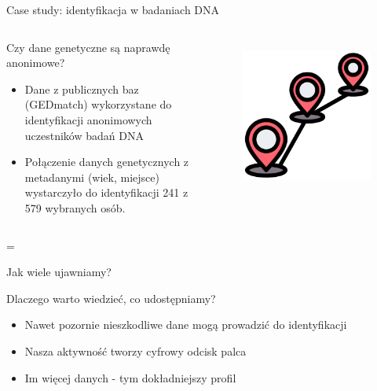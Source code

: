   \begin{frame}{Case study: identyfikacja w badaniach DNA}
  \begin{columns}[c]
      \begin{alertblock}{Czy dane genetyczne są naprawdę anonimowe?}
        \begin{itemize}
          \item Dane z publicznych baz (GEDmatch) wykorzystane do identyfikacji anonimowych uczestników badań DNA
          \item Połączenie danych genetycznych z metadanymi (wiek, miejsce) wystarczyło do identyfikacji 241 z 579 wybranych osób.\cite{DNA_LEAK}
        \end{itemize}
      \end{alertblock}
      \begin{figure}
        \centering
        \includegraphics[height=0.45\textheight]{images/routing.png}
        \label{fig:dnaCase}
      \end{figure}
  \end{columns}=
  \end{frame}
  
  \begin{frame}{Jak wiele ujawniamy?}
    \begin{alertblock}{Dlaczego warto wiedzieć, co udostępniamy?}
      \begin{itemize}
        \item Nawet pozornie nieszkodliwe dane mogą prowadzić do identyfikacji
        \item Nasza aktywność tworzy cyfrowy odcisk palca
        \item Im więcej danych - tym dokładniejszy profil
      \end{itemize}
    \end{alertblock}
  \end{frame}